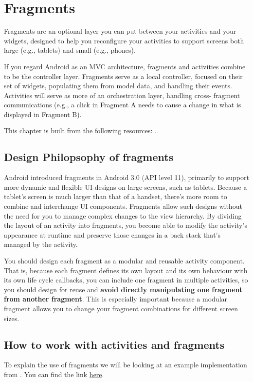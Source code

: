 
\chapter{Fragments}
Fragments are an optional layer you can put between your activities and your
widgets, designed to help you reconfigure your activities to support screens both
large (e.g., tablets) and small (e.g., phones). 

If you regard Android as an MVC architecture, fragments and
activities combine to be the controller layer. Fragments serve as a local controller, focused on their set of widgets, populating them from model data, and handling
their events. Activities will serve as more of an orchestration layer, handling cross-
fragment communications (e.g., a click in Fragment A needs to cause a change in what is displayed in Fragment B).

This chapter is built from the following resources: \cite{Point2017, TueDao2017, Guide2017, murphymarkl.2017}.

\section{Design Philopsophy of fragments}
Android introduced fragments in Android 3.0 (API level 11), primarily to support more dynamic and flexible UI designs on large screens, such as tablets. Because a tablet's screen is much larger than that of a handset, there's more room to combine and interchange UI components. Fragments allow such designs without the need for you to manage complex changes to the view hierarchy. By dividing the layout of an activity into fragments, you become able to modify the activity's appearance at runtime and preserve those changes in a back stack that's managed by the activity.

You should design each fragment as a modular and reusable activity component. That is, because each fragment defines its own layout and its own behaviour with its own life cycle callbacks, you can include one fragment in multiple activities, so you should design for reuse and \textbf{avoid directly manipulating one fragment from another fragment}. This is especially important because a modular fragment allows you to change your fragment combinations for different screen sizes.

\section{How to work with activities and fragments}
To explain the use of fragments we will be looking at an example implementation from  \cite{murphymarkl.2017}. You can find the link \href{https://github.com/commonsguy/cw-omnibus/tree/master/Fragments/Static}{here}.

